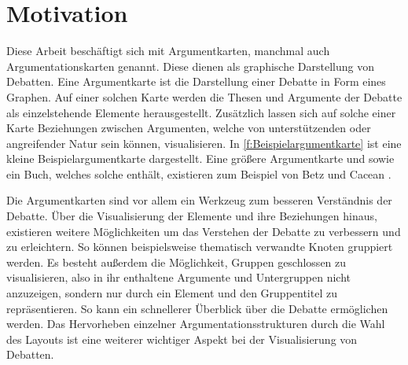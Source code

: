 \chapter{Motivation}
Diese Arbeit beschäftigt sich mit Argumentkarten, manchmal auch Argumentationskarten genannt. Diese dienen als graphische Darstellung von Debatten. Eine Argumentkarte ist die Darstellung einer Debatte in Form eines Graphen.
Auf einer solchen Karte werden die Thesen und Argumente der Debatte als einzelstehende Elemente herausgestellt. 
Zusätzlich lassen sich auf solche einer Karte Beziehungen zwischen Argumenten, welche von unterstützenden oder angreifender Natur sein können, visualisieren.
In \autoref{f:Beispielargumentkarte} ist eine kleine Beispielargumentkarte dargestellt. 
Eine größere Argumentkarte und sowie ein Buch, welches solche enthält, existieren zum Beispiel von Betz und Cacean \cite{ClimateEngineering, betz2012ethical}.



Die Argumentkarten sind vor allem ein Werkzeug zum besseren Verständnis der Debatte. 
Über die Visualisierung der Elemente und ihre Beziehungen hinaus, existieren weitere Möglichkeiten um das Verstehen der Debatte zu verbessern und zu erleichtern.
So können beispielsweise thematisch verwandte Knoten gruppiert werden. 
Es besteht außerdem die Möglichkeit, Gruppen geschlossen zu visualisieren, also in ihr enthaltene Argumente und Untergruppen nicht anzuzeigen, sondern nur durch ein
Element und den Gruppentitel zu repräsentieren. So kann ein schnellerer  Überblick über die Debatte ermöglichen werden.
Das Hervorheben einzelner Argumentationsstrukturen durch die Wahl des Layouts ist eine weiterer wichtiger Aspekt bei der Visualisierung von Debatten.

